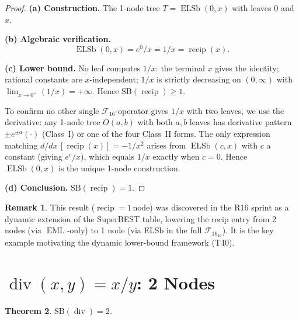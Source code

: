 \documentclass[12pt,a4paper]{article}
\newtheorem{theorem}{Theorem}[section]
\theoremstyle{definition}
\newtheorem{remark}[theorem]{Remark}
\newcommand{\EML}{\operatorname{EML}}
\newcommand{\ELSb}{\operatorname{ELSb}}
\newcommand{\recip}{\operatorname{recip}}
\newcommand{\divop}{\operatorname{div}}
\newcommand{\SB}{\mathrm{SB}}
\newcommand{\F}{\mathcal{F}_{16}}
\begin{document}
\begin{proof}
\textbf{(a) Construction.}
The 1-node tree $T = \ELSb(0,x)$ with leaves $0$ and $x$.

\textbf{(b) Algebraic verification.}
\[
  \ELSb(0,x) = e^0 / x = 1/x = \recip(x).
\]

\textbf{(c) Lower bound.}
No leaf computes $1/x$: the terminal $x$ gives the identity; rational
constants are $x$-independent; $1/x$ is strictly decreasing on $(0,\infty)$
with $\lim_{x\to 0^+} (1/x) = +\infty$.  Hence $\SB(\recip) \ge 1$.

To confirm no other single $\F$-operator gives $1/x$ with two leaves, we
use the derivative: any 1-node tree $O(a,b)$ with both $a,b$ leaves has
derivative pattern $\pm e^{\pm a}(\cdot)$ (Class~I) or one of the four
Class~II forms.  The only expression matching $d/dx\,[\recip(x)] = -1/x^2$
arises from $\ELSb(c,x)$ with $c$ a constant (giving $e^c/x$), which equals
$1/x$ exactly when $c=0$.  Hence $\ELSb(0,x)$ is the unique 1-node construction.

\textbf{(d) Conclusion.} $\SB(\recip) = 1$.
\end{proof}

\begin{remark}
This result ($\recip = 1\,\text{node}$) was discovered in the R16 sprint
as a dynamic extension of the SuperBEST table, lowering the recip entry
from 2 nodes (via $\EML$-only) to 1 node (via ELSb in the full $\F_{16}$).
It is the key example motivating the dynamic lower-bound framework (T40).
\end{remark}

\section{\texorpdfstring{$\divop(x,y) = x/y$}{div(x,y)}: 2 Nodes}
\label{sec:div}

\begin{theorem}
\label{thm:div}
$\SB(\divop) = 2$.
\end{theorem}
\end{document}
